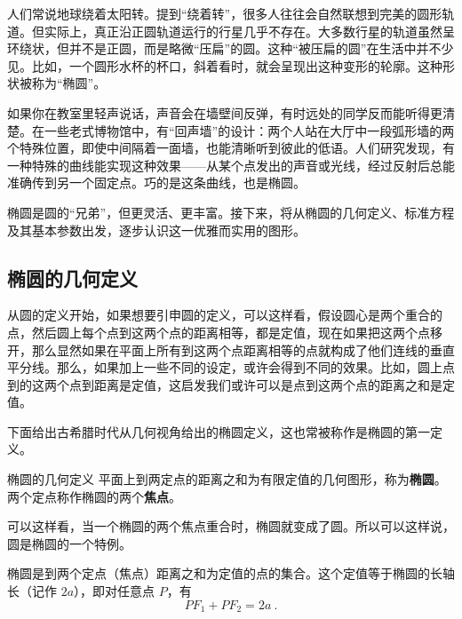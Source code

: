 
\begin{issues}
\issueDraft
\end{issues}


人们常说地球绕着太阳转。提到“绕着转”，很多人往往会自然联想到完美的圆形轨道。但实际上，真正沿正圆轨道运行的行星几乎不存在。大多数行星的轨道虽然呈环绕状，但并不是正圆，而是略微“压扁”的圆。这种“被压扁的圆”在生活中并不少见。比如，一个圆形水杯的杯口，斜着看时，就会呈现出这种变形的轮廓。这种形状被称为“椭圆”。

如果你在教室里轻声说话，声音会在墙壁间反弹，有时远处的同学反而能听得更清楚。在一些老式博物馆中，有“回声墙”的设计：两个人站在大厅中一段弧形墙的两个特殊位置，即使中间隔着一面墙，也能清晰听到彼此的低语。人们研究发现，有一种特殊的曲线能实现这种效果——从某个点发出的声音或光线，经过反射后总能准确传到另一个固定点。巧的是这条曲线，也是椭圆。

椭圆是圆的“兄弟”，但更灵活、更丰富。接下来，将从椭圆的几何定义、标准方程及其基本参数出发，逐步认识这一优雅而实用的图形。

\subsection{椭圆的几何定义}





从圆的定义开始，如果想要引申圆的定义，可以这样看，假设圆心是两个重合的点，然后圆上每个点到这两个点的距离相等，都是定值，现在如果把这两个点移开，那么显然如果在平面上所有到这两个点距离相等的点就构成了他们连线的垂直平分线。那么，如果加上一些不同的设定，或许会得到不同的效果。比如，圆上点到的这两个点到距离是定值，这启发我们或许可以是点到这两个点的距离之和是定值。

下面给出古希腊时代从几何视角给出的椭圆定义，这也常被称作是椭圆的第一定义。

\begin{definition}{椭圆的几何定义}
平面上到两定点的距离之和为有限定值的几何图形，称为\textbf{椭圆}。两个定点称作椭圆的两个\textbf{焦点}。
\end{definition}

可以这样看，当一个椭圆的两个焦点重合时，椭圆就变成了圆。所以可以这样说，圆是椭圆的一个特例。

椭圆是到两个定点（焦点）距离之和为定值的点的集合。这个定值等于椭圆的长轴长（记作 $2a$），即对任意点 $P$，有
$$ PF_1 + PF_2 = 2a ~.$$
